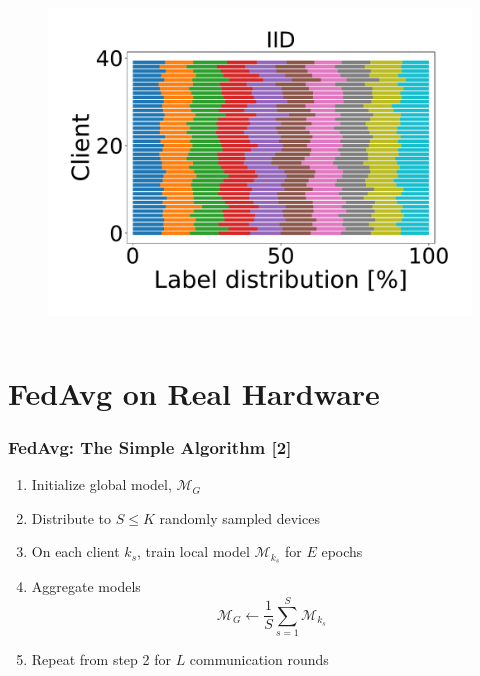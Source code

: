 \documentclass{beamer}
\begin{document}
\begin{frame}
\begin{columns}
\begin{column}{.55\textwidth}
\begin{figure}[htb!]
				\includegraphics[width=0.49\linewidth]{imgs/splits(IID)}
			\end{figure}
		\end{column}
	\end{columns}
\end{frame}

\section{FedAvg on Real Hardware}
\begin{frame}
    \frametitle{FedAvg: The Simple Algorithm [2]}
    \begin{enumerate}
        \item Initialize global model, $\mathcal M_G$
        \item Distribute to $S \le K$ randomly sampled devices
        \item On each client $k_s$, train local model $\mathcal M_{k_s}$ for $E$ epochs
        \item Aggregate models
    \begin{equation*}
        \mathcal M_G \gets \frac{1}{S} \sum_{s=1}^{S} \mathcal M_{k_s}
    \end{equation*}
        \item Repeat from step 2 for $L$ communication rounds
    \end{enumerate}
\end{frame}
\end{document}
